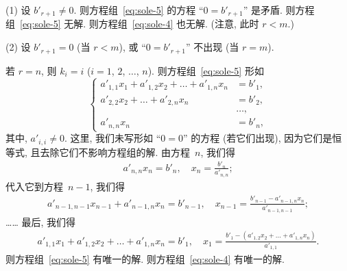 \documentclass[../libro.tex]{subfiles}
\begin{document}
(1)
设 \(b'_{r+1} \neq 0\).
则方程组~\eqref{eq:sole-5} 的方程
``\(0 = b'_{r+1}\)'' 是矛盾.
则方程组~\eqref{eq:sole-5} 无解.
则方程组~\eqref{eq:sole-4} 也无解.
(注意, 此时 \(r < m\).)

(2)
设 \(b'_{r+1} = 0\) (当 \(r < m\)),
或 ``\(0 = b'_{r+1}\)'' 不出现 (当 \(r = m\)).

若 \(r = n\),
则 \(k_i = i\) (\(i = 1\), \(2\), \(\dots\), \(n\)).
则方程组~\eqref{eq:sole-5} 形如
\begin{equation*}
    \left\{ %
    \begin{aligned}
        a'_{1,1} x_1 + a'_{1,2} x_2 + \dots + a'_{1,n} x_n & = b'_1, \\
        a'_{2,2} x_2 + \dots + a'_{2,n} x_n                & = b'_2, \\
        & \dots, \\
        a'_{n,n} x_n                                       & = b'_n,
    \end{aligned}
    \right. %
\end{equation*}
其中, \(a'_{i,i} \neq 0\).
这里, 我们未写形如 ``\(0 = 0\)'' 的方程 (若它们出现),
因为它们是恒等式,
且去除它们不影响方程组的解.
由方程~\(n\), 我们得
\begin{align*}
    a'_{n,n} x_n = b'_n,
    \quad
    x_n = \frac{b'_n}{a'_{n,n}};
\end{align*}
代入它到方程~\(n-1\), 我们得
\begin{align*}
    a'_{n-1,n-1} x_{n-1} + a'_{n-1,n} x_{n} = b'_{n-1},
    \quad
    x_{n-1} = \frac{b'_{n-1} - a'_{n-1,n} x_{n}}{a'_{n-1,n-1}};
\end{align*}
……
最后, 我们得
\begin{align*}
    a'_{1,1} x_1 + a'_{1,2} x_2 + \dots + a'_{1,n} x_n = b'_1,
    \quad
    x_1 = \frac{b'_1 - (a'_{1,2} x_2 + \dots + a'_{1,n} x_n)}{a'_{1,1}}.
\end{align*}
则方程组~\eqref{eq:sole-5} 有唯一的解.
则方程组~\eqref{eq:sole-4} 有唯一的解.
\end{document}
